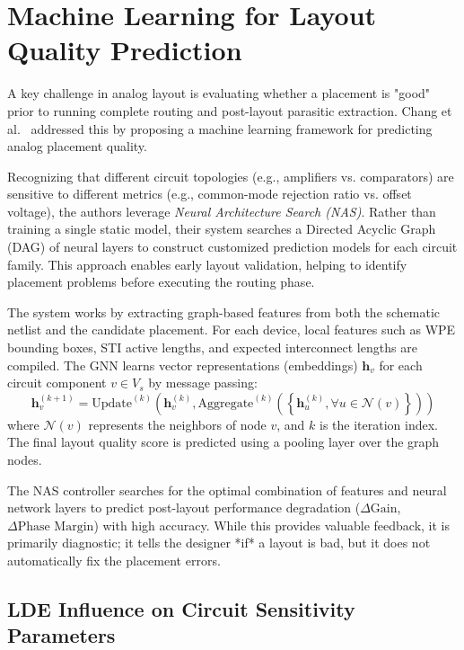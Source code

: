 \section{Machine Learning for Layout Quality Prediction}
\label{sec:lit_quality}

A key challenge in analog layout is evaluating whether a placement is "good" prior to running complete routing and post-layout parasitic extraction. Chang et al.~\cite{nasplacement} addressed this by proposing a machine learning framework for predicting analog placement quality.

Recognizing that different circuit topologies (e.g., amplifiers vs. comparators) are sensitive to different metrics (e.g., common-mode rejection ratio vs. offset voltage), the authors leverage \textit{Neural Architecture Search (NAS)}. Rather than training a single static model, their system searches a Directed Acyclic Graph (DAG) of neural layers to construct customized prediction models for each circuit family. This approach enables early layout validation, helping to identify placement problems before executing the routing phase.

The system works by extracting graph-based features from both the schematic netlist and the candidate placement. For each device, local features such as WPE bounding boxes, STI active lengths, and expected interconnect lengths are compiled. The GNN learns vector representations (embeddings) $\mathbf{h}_v$ for each circuit component $v \in V_s$ by message passing:
\begin{equation}
    \mathbf{h}_v^{(k+1)} = \text{Update}^{(k)}\left(\mathbf{h}_v^{(k)}, \text{Aggregate}^{(k)}\left(\left\{\mathbf{h}_u^{(k)}, \forall u \in \mathcal{N}(v)\right\}\right)\right)
\end{equation}
where $\mathcal{N}(v)$ represents the neighbors of node $v$, and $k$ is the iteration index. The final layout quality score is predicted using a pooling layer over the graph nodes.

The NAS controller searches for the optimal combination of features and neural network layers to predict post-layout performance degradation ($\Delta \text{Gain}$, $\Delta \text{Phase Margin}$) with high accuracy. While this provides valuable feedback, it is primarily diagnostic; it tells the designer *if* a layout is bad, but it does not automatically fix the placement errors.

\subsection{LDE Influence on Circuit Sensitivity Parameters}

